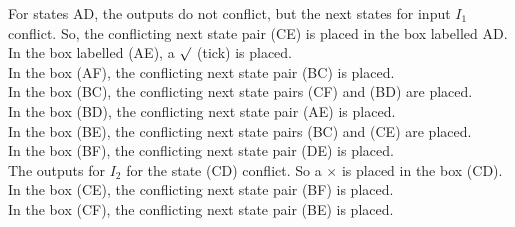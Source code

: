 \documentclass[9pt]{beamer}
\begin{document}
\begin{frame}

\hspace*{0.5cm} For states AD, the outputs do not conflict, but the next states for input $I_1$ conflict. So, the conflicting
next state pair (CE) is placed in the box labelled AD.\\
\hspace*{0.5cm} In the box labelled (AE), a $\surd$ (tick) is placed.\\
\hspace*{0.5cm} In the box (AF), the conflicting next state pair (BC) is placed.\\
\hspace*{0.5cm} In the box (BC), the conflicting next state pairs (CF) and (BD) are placed.\\
\hspace*{0.5cm} In the box (BD), the conflicting next state pair (AE) is placed.\\
\hspace*{0.5cm} In the box (BE), the conflicting next state pairs (BC) and (CE) are placed.\\
\hspace*{0.5cm} In the box (BF), the conflicting next state pair (DE) is placed.\\
\hspace*{0.5cm} The outputs for $I_2$ for the state (CD) conflict. So a $\times$ is placed in the box (CD).\\
\hspace*{0.5cm} In the box (CE), the conflicting next state pair (BF) is placed.\\
\hspace*{0.5cm} In the box (CF), the conflicting next state pair (BE) is placed.\\
\end{frame}
\end{document}
